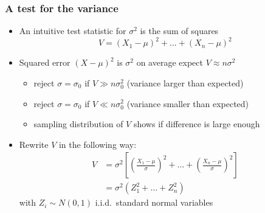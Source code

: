 \documentclass[t]{beamer} %
\begin{document}
\begin{frame}
  \frametitle{A test for the variance}

  \begin{itemize}
  \item An intuitive test statistic for $\sigma^2$ is the sum of squares
    \[
    V = (X_1 - \mu)^2 + \dots + (X_n - \mu)^2
    \]
  \item Squared error $(X - \mu)^2$ is $\sigma^2$ on average \so expect
    $V\approx n \sigma^2$
    \begin{itemize}
    \item reject $\sigma = \sigma_0$ if $V\gg n \sigma^2_0$ (variance larger than expected)
    \item reject $\sigma = \sigma_0$ if $V\ll n \sigma^2_0$ (variance smaller than expected)
    \item[\hand] sampling distribution of $V$ shows if difference is large
      enough
    \end{itemize}
    \pause
  \item Rewrite $V$ in the following way:
    \begin{align*}
      V &= \sigma^2 \left[
        \left( \frac{X_1 - \mu}{\sigma} \right)^2 + \dots 
        + \left( \frac{X_n - \mu}{\sigma} \right)^2
      \right] \\
      &= \sigma^2 (Z_1^2 + \dots + Z_n^2)
    \end{align*}
    with $Z_i\sim N(0,1)$ i.i.d.\ standard normal variables
  \end{itemize}
\end{frame}
\end{document}
